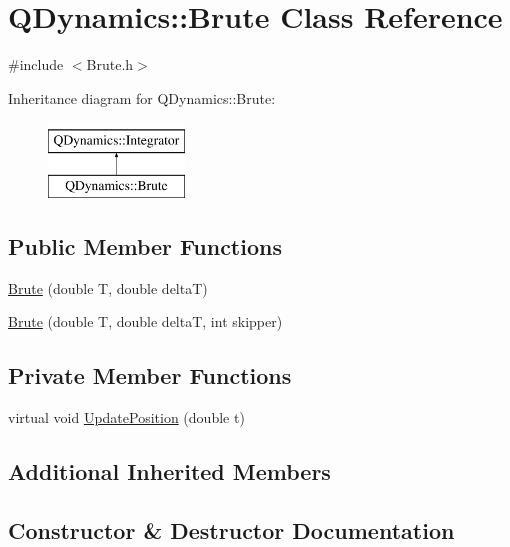 \hypertarget{classQDynamics_1_1Brute}{}\section{Q\+Dynamics\+:\+:Brute Class Reference}
\label{classQDynamics_1_1Brute}


{\ttfamily \#include $<$Brute.\+h$>$}

Inheritance diagram for Q\+Dynamics\+:\+:Brute\+:\begin{figure}[H]
\begin{center}
\leavevmode
\includegraphics[height=2.000000cm]{classQDynamics_1_1Brute}
\end{center}
\end{figure}
\subsection*{Public Member Functions}
\begin{DoxyCompactItemize}
\item 
\hyperlink{classQDynamics_1_1Brute_a2ef1df08140810ffbc9a3e8b97561bbb}{Brute} (double T, double deltaT)
\item 
\hyperlink{classQDynamics_1_1Brute_a5f04abe903e88405c24fb5695db6357f}{Brute} (double T, double deltaT, int skipper)
\end{DoxyCompactItemize}
\subsection*{Private Member Functions}
\begin{DoxyCompactItemize}
\item 
virtual void \hyperlink{classQDynamics_1_1Brute_ac5d4bbe0e34a9f6836f71f40ae8a9eb4}{Update\+Position} (double t)
\end{DoxyCompactItemize}
\subsection*{Additional Inherited Members}


\subsection{Constructor \& Destructor Documentation}
\mbox{\label{classQDynamics_1_1Brute_a2ef1df08140810ffbc9a3e8b97561bbb}} 
